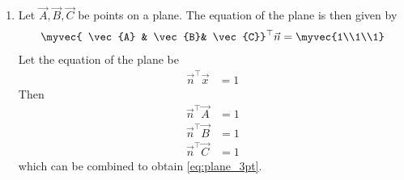 \begin{enumerate}[label=\thesubsubsection.\arabic*.,ref=\thesubsubsection.\theenumi]
\item Let $\vec{A}, \vec{B}, \vec{C}$ be  points on a plane.  The equation of the plane is then given by 	
\begin{align}
	\myvec{	\vec{A} & \vec{B}& \vec{C}}^{\top} \vec{n}= \myvec{1\\1\\1}
	\label{eq:plane_3pt}
\end{align}
\solution Let the equation of the plane be 
\begin{align}
	\vec{n}^{\top}	\vec{x} &= 1
\end{align}
Then 
\begin{align}
	\vec{n}^{\top}	\vec{A} &= 1
	\\
	\vec{n}^{\top}	\vec{B} &= 1
	\\
	\vec{n}^{\top}	\vec{C} &= 1
\end{align}
which can be combined to obtain 
	\eqref{eq:plane_3pt}.
\end{enumerate}
\iffalse

